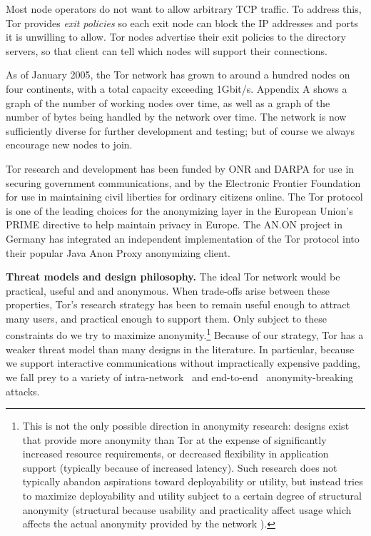 \documentclass{llncs}
\begin{document}
Most node operators do not want to allow arbitrary TCP traffic. %
To address this, Tor provides \emph{exit policies} so
each exit node can block the IP addresses and ports it is unwilling to allow.
Tor nodes advertise their exit policies to the directory servers, so that
client can tell which nodes will support their connections.

As of January 2005, the Tor network has grown to around a hundred nodes
on four continents, with a total capacity exceeding 1Gbit/s. Appendix A
shows a graph of the number of working nodes over time, as well as a
graph of the number of bytes being handled by the network over time.
The network is now sufficiently diverse for further development
and testing; but of course we always encourage new nodes
to join.

Tor research and development has been funded by ONR and DARPA
for use in securing government
communications, and by the Electronic Frontier Foundation for use
in maintaining civil liberties for ordinary citizens online. The Tor
protocol is one of the leading choices
for the anonymizing layer in the European Union's PRIME directive to
help maintain privacy in Europe.
The AN.ON project in Germany
has integrated an independent implementation of the Tor protocol into
their popular Java Anon Proxy anonymizing client.

\medskip
\noindent
{\bf Threat models and design philosophy.}
The ideal Tor network would be practical, useful and and anonymous. When
trade-offs arise between these properties, Tor's research strategy has been
to remain useful enough to attract many users,
and practical enough to support them.  Only subject to these
constraints do we try to maximize
anonymity.\footnote{This is not the only possible
direction in anonymity research: designs exist that provide more anonymity
than Tor at the expense of significantly increased resource requirements, or
decreased flexibility in application support (typically because of increased
latency).  Such research does not typically abandon aspirations toward
deployability or utility, but instead tries to maximize deployability and
utility subject to a certain degree of structural anonymity (structural because
usability and practicality affect usage which affects the actual anonymity
provided by the network \cite{econymics,back01}).}
Because of our strategy, Tor has a weaker threat model than many designs in
the literature.  In particular, because we
support interactive communications without impractically expensive padding,
we fall prey to a variety
of intra-network~\cite{back01,attack-tor-oak05,flow-correlation04} and
end-to-end~\cite{danezis-pet2004,SS03} anonymity-breaking attacks.
\end{document}
